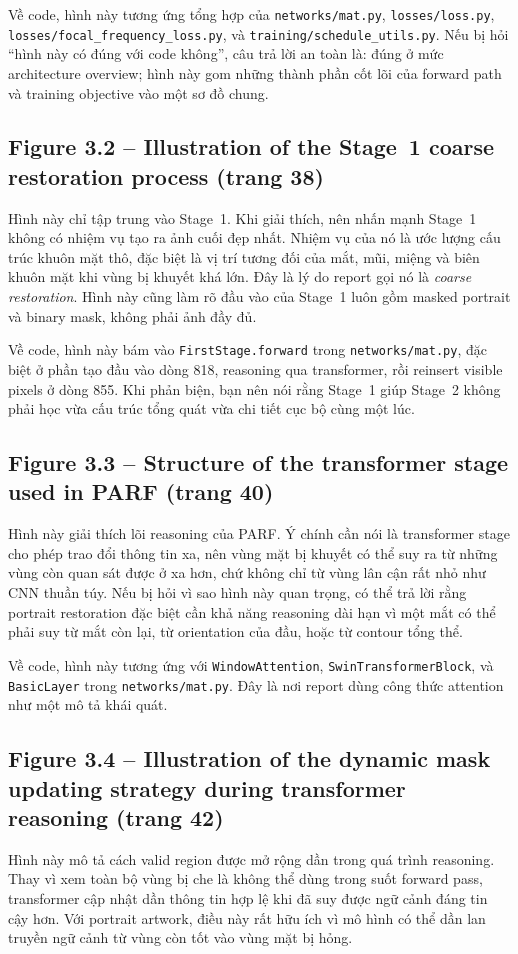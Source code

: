 \documentclass[12pt,a4paper]{article}
\begin{document}
Về code, hình này tương ứng tổng hợp của \texttt{networks/mat.py}, \texttt{losses/loss.py}, \texttt{losses/focal\_frequency\_loss.py}, và \texttt{training/schedule\_utils.py}. Nếu bị hỏi ``hình này có đúng với code không'', câu trả lời an toàn là: đúng ở mức architecture overview; hình này gom những thành phần cốt lõi của forward path và training objective vào một sơ đồ chung.

\subsection*{Figure 3.2 -- Illustration of the Stage~1 coarse restoration process (trang 38)}
Hình này chỉ tập trung vào Stage~1. Khi giải thích, nên nhấn mạnh Stage~1 không có nhiệm vụ tạo ra ảnh cuối đẹp nhất. Nhiệm vụ của nó là ước lượng cấu trúc khuôn mặt thô, đặc biệt là vị trí tương đối của mắt, mũi, miệng và biên khuôn mặt khi vùng bị khuyết khá lớn. Đây là lý do report gọi nó là \emph{coarse restoration}. Hình này cũng làm rõ đầu vào của Stage~1 luôn gồm masked portrait và binary mask, không phải ảnh đầy đủ.

Về code, hình này bám vào \texttt{FirstStage.forward} trong \texttt{networks/mat.py}, đặc biệt ở phần tạo đầu vào dòng 818, reasoning qua transformer, rồi reinsert visible pixels ở dòng 855. Khi phản biện, bạn nên nói rằng Stage~1 giúp Stage~2 không phải học vừa cấu trúc tổng quát vừa chi tiết cục bộ cùng một lúc.

\subsection*{Figure 3.3 -- Structure of the transformer stage used in PARF (trang 40)}
Hình này giải thích lõi reasoning của PARF. Ý chính cần nói là transformer stage cho phép trao đổi thông tin xa, nên vùng mặt bị khuyết có thể suy ra từ những vùng còn quan sát được ở xa hơn, chứ không chỉ từ vùng lân cận rất nhỏ như CNN thuần túy. Nếu bị hỏi vì sao hình này quan trọng, có thể trả lời rằng portrait restoration đặc biệt cần khả năng reasoning dài hạn vì một mắt có thể phải suy từ mắt còn lại, từ orientation của đầu, hoặc từ contour tổng thể.

Về code, hình này tương ứng với \texttt{WindowAttention}, \texttt{SwinTransformerBlock}, và \texttt{BasicLayer} trong \texttt{networks/mat.py}. Đây là nơi report dùng công thức attention như một mô tả khái quát.

\subsection*{Figure 3.4 -- Illustration of the dynamic mask updating strategy during transformer reasoning (trang 42)}
Hình này mô tả cách valid region được mở rộng dần trong quá trình reasoning. Thay vì xem toàn bộ vùng bị che là không thể dùng trong suốt forward pass, transformer cập nhật dần thông tin hợp lệ khi đã suy được ngữ cảnh đáng tin cậy hơn. Với portrait artwork, điều này rất hữu ích vì mô hình có thể dần lan truyền ngữ cảnh từ vùng còn tốt vào vùng mặt bị hỏng.
\end{document}
